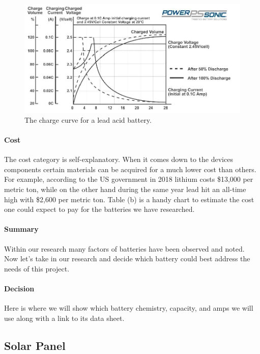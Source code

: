 \begin{figure}
    \centering
    \includegraphics[scale=0.5]{figures/lead acid charge curve.png}
    \caption{The charge curve for a lead acid battery.}
    \label{fig:lead-acid-charge-curve} 
\end{figure}
\paragraph{Cost}
The cost category is self-explanatory. When it comes down to the devices components certain materials can be acquired for a much lower cost than others. For example, according to the US government in 2018 lithium costs \$13,000 per metric ton, while on the other hand during the same year lead hit an all-time high with \$2,600 per metric ton. Table (b) is a handy chart to estimate the cost one could expect to pay for the batteries we have researched. 

\paragraph{Summary}
Within our research many factors of batteries have been observed and noted. Now let's take in our research and decide which battery could best address the needs of this project. 

\paragraph{Decision}
Here is where we will show which battery chemistry, capacity, and amps we will use along with a link to its data sheet. 

\subsection{Solar Panel}

